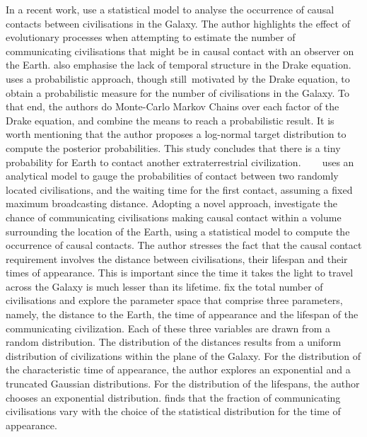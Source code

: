 \documentclass[crop]{CSLB}
\begin{document}
In a recent work, \citep{balbi_impact_2018} use a statistical model to analyse the occurrence of causal contacts between civilisations in the Galaxy.
%
The author highlights the effect of evolutionary processes when attempting to estimate the number of communicating civilisations that might be in causal contact with an observer on the Earth.
%
\citet{cirkovic_temporal_2004} also emphasise the lack of temporal structure in the Drake equation.
%
\citet{bloetscher_using_2019} uses a probabilistic approach, though still motivated by the Drake equation, to obtain a probabilistic measure for the number of civilisations in the Galaxy.
%
To that end, the authors do Monte-Carlo Markov Chains over each factor of the Drake equation, and combine the means to reach a probabilistic result.
%
It is worth mentioning that the author proposes a log-normal target distribution to compute the posterior probabilities.
%
This study concludes that there is a tiny probability for Earth to contact another extraterrestrial civilization.    
%
\citet{smith_broadcasting_2009} uses an analytical model to gauge the probabilities of contact between two randomly located civilisations, and the waiting time for the first contact, assuming a fixed maximum broadcasting distance.
% 
Adopting a novel approach, \citet{balbi_impact_2018} investigate the chance of communicating civilisations making causal contact within a volume surrounding the location of the Earth, using a statistical model to compute the occurrence of causal contacts.
%
The author stresses the fact that the causal contact requirement involves the distance between civilisations, their lifespan and their times of appearance. This is important since the time it takes the light to travel across the Galaxy is much lesser than its lifetime.
%
\citet{balbi_impact_2018} fix the total number of civilisations and explore the parameter space that comprise three parameters, namely, the distance to the Earth, the time of appearance and the lifespan of the communicating civilization.
%
Each of these three variables are drawn from a random distribution. The distribution of the distances results from a uniform distribution of civilizations within the plane of the Galaxy.
%
For the distribution of the characteristic time of appearance, the author explores an exponential and a truncated Gaussian distributions. For the distribution of the lifespans, the author chooses an exponential distribution.
%
\citet{balbi_impact_2018} finds that the fraction of communicating civilisations vary with the choice of the statistical distribution for the time of appearance. 
\end{document}
